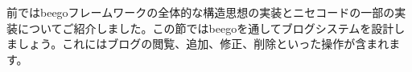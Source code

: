 前ではbeegoフレームワークの全体的な構造思想の実装とニセコードの一部の実装についてご紹介しました。この節ではbeegoを通してブログシステムを設計しましょう。これにはブログの閲覧、追加、修正、削除といった操作が含まれます。
